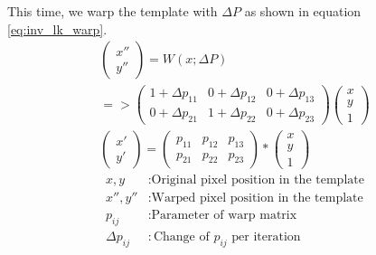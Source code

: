 \documentclass[11pt,a4paper,titlepage,oneside]{report}
\begin{document}
This time, we warp the template with $\Delta P$ as shown in equation \ref{eq:inv_lk_warp}. 
\begin{equation}\label{eq:inv_lk_warp}
  \begin{gathered}
    \begin{pmatrix}
      x'' \\
      y''
    \end{pmatrix}=
    W(x;\Delta P)\\
    =>\begin{pmatrix}
      1 + \Delta p_{11} & 0 + \Delta p_{12} & 0 + \Delta p_{13} \\
      0 + \Delta p_{21} & 1 + \Delta p_{22} & 0 + \Delta p_{23}
    \end{pmatrix}
    \begin{pmatrix}
      x\\
      y\\
      1
    \end{pmatrix}\\
    \begin{pmatrix}
      x' \\
      y'
    \end{pmatrix}=
    \begin{pmatrix}
      p_{11} & p_{12} & p_{13} \\
      p_{21} & p_{22} & p_{23}
    \end{pmatrix}*
    \begin{pmatrix}
      x\\
      y\\
      1
    \end{pmatrix}
  \end{gathered}
\end{equation}
\begin{align*}
  x,y            &: \text{Original pixel position in the template}\\
  x'',y''        &: \text{Warped pixel position in the template}\\
  p_{ij}         &: \text{Parameter of warp matrix}\\
  \Delta p_{ij}  &: \text{Change of $p_{ij}$ per iteration}
\end{align*}
\end{document}
